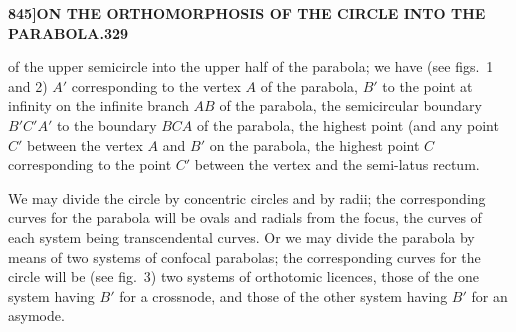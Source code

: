 \documentclass[11pt,a4paper]{book}
\begin{document}
\begin{figure}[H]
\centering
{}
\qquad
{}
\end{figure}

\newpage
\setcounter{page}{329}

\noindent\textbf{845]}\hfill\textbf{ON THE ORTHOMORPHOSIS OF THE CIRCLE INTO THE PARABOLA.}\hfill\textbf{329}

\bigskip

\noindent of the upper semicircle into the upper half of the parabola; we have (see figs.\ 1 and 2) $A'$ corresponding to the vertex $A$ of the parabola, $B'$ to the point at infinity on the infinite branch $AB$ of the parabola, the semicircular boundary $B'C'A'$ to the boundary $BCA$ of the parabola, the highest point (and any point $C'$ between the vertex $A$ and $B'$ on the parabola, the highest point $C$ corresponding to the point $C'$ between the vertex and the semi-latus rectum.

\begin{figure}[H]
\centering
{}
\end{figure}

We may divide the circle by concentric circles and by radii; the corresponding curves for the parabola will be ovals and radials from the focus, the curves of each system being transcendental curves. Or we may divide the parabola by means of two systems of confocal parabolas; the corresponding curves for the circle will be (see fig.\ 3) two systems of orthotomic licences, those of the one system having $B'$ for a crossnode, and those of the other system having $B'$ for an asymode.
\end{document}
